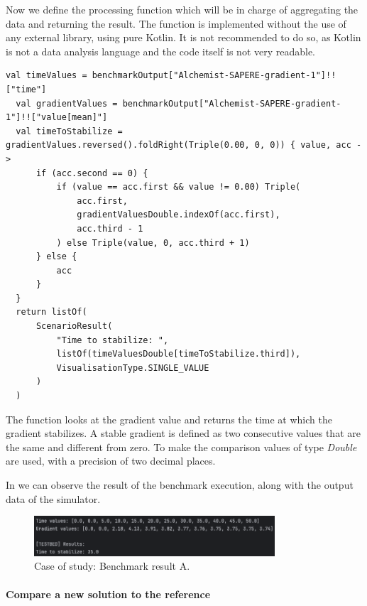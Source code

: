 \documentclass[12pt,a4paper,openright,twoside]{book}
\begin{document}
Now we define the processing function which will be in charge of aggregating the data and returning the result.
The function is implemented without the use of any external library, using pure Kotlin.
It is not recommended to do so, as Kotlin is not a data analysis language and the code itself is not very readable.

\begin{lstlisting}[style=my-kotlin, language=my-kotlin, caption={Case of study: output processing function.}]
  val timeValues = benchmarkOutput["Alchemist-SAPERE-gradient-1"]!!["time"]
  val gradientValues = benchmarkOutput["Alchemist-SAPERE-gradient-1"]!!["value[mean]"]
  val timeToStabilize = gradientValues.reversed().foldRight(Triple(0.00, 0, 0)) { value, acc ->
      if (acc.second == 0) {
          if (value == acc.first && value != 0.00) Triple(
              acc.first,
              gradientValuesDouble.indexOf(acc.first),
              acc.third - 1
          ) else Triple(value, 0, acc.third + 1)
      } else {
          acc
      }
  }
  return listOf(
      ScenarioResult(
          "Time to stabilize: ",
          listOf(timeValuesDouble[timeToStabilize.third]),
          VisualisationType.SINGLE_VALUE
      )
  )
\end{lstlisting}

The function looks at the gradient value and returns the time at which the gradient stabilizes.
A stable gradient is defined as two consecutive values that are the same and different from zero.
To make the comparison values of type \textit{Double} are used, with a precision of two decimal places.

In  we can observe the result of the benchmark execution, along with the output data of the simulator.

\begin{figure}[h!]
  \centering
  \includegraphics[width=0.8\textwidth]{figures/result-A.png}
  \caption{Case of study: Benchmark result A.}
  \label{fig:result-A}
\end{figure}

\paragraph*{Compare a new solution to the reference}
\end{document}
